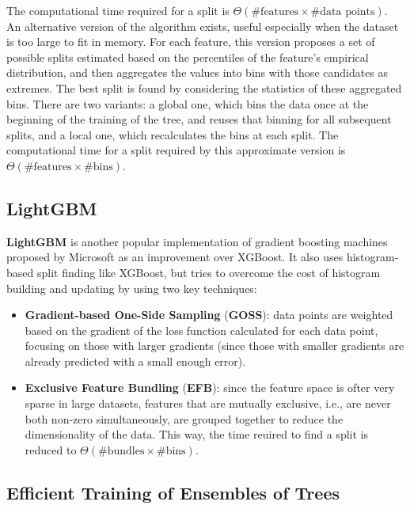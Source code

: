 The computational time required for a split is $\Theta (\# \text{features} \times \# \text{data points})$. An alternative version of the algorithm exists, useful especially when the dataset is too large to fit in memory. For each feature, this version proposes a set of possible splits estimated based on the percentiles of the feature's empirical distribution, and then aggregates the values into bins with those candidates as extremes. The best split is found by considering the statistics of these aggregated bins. There are two variants: a global one, which bins the data once at the beginning of the training of the tree, and reuses that binning for all subsequent splits, and a local one, which recalculates the bins at each split. The computational time for a split required by this approximate version is $\Theta (\# \text{features} \times \# \text{bins})$.

\subsection{LightGBM}

\textbf{LightGBM} is another popular implementation of gradient boosting machines proposed by Microsoft as an improvement over XGBoost. It also uses histogram-based split finding like XGBoost, but tries to overcome the cost of histogram building and updating by using two key techniques:
\begin{itemize}
    \item \textbf{Gradient-based One-Side Sampling} (\textbf{GOSS}): data points are weighted based on the gradient of the loss function calculated for each data point, focusing on those with larger gradients (since those with smaller gradients are already predicted with a small enough error).

    \item \textbf{Exclusive Feature Bundling} (\textbf{EFB}): since the feature space is ofter very sparse in large datasets, features that are mutually exclusive, i.e., are never both non-zero simultaneously, are grouped together to reduce the dimensionality of the data. This way, the time reuired to find a split is reduced to $\Theta (\# \text{bundles} \times \# \text{bins})$.
\end{itemize}

\subsection{Efficient Training of Ensembles of Trees}

